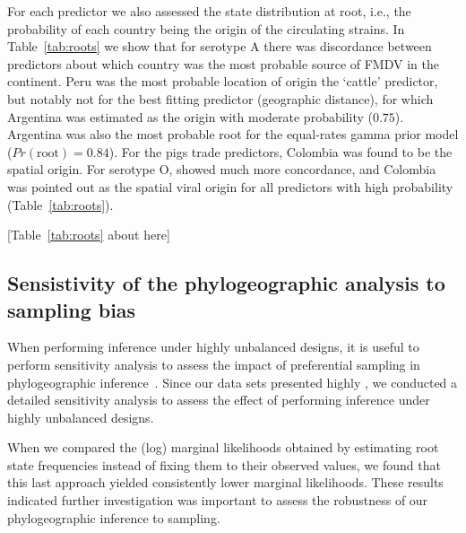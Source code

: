 \documentclass[10pt]{article}
\begin{document}
For each predictor we also assessed the state distribution at root, i.e., the probability of each country being the origin of the circulating strains.
In Table~\ref{tab:roots} we show that for serotype A there was discordance between predictors about which country was the most probable source of FMDV in the continent.
Peru was the most probable location of origin the `cattle' predictor, but notably not for the best fitting predictor (geographic distance), for which Argentina was estimated as the origin with moderate probability ($0.75$).
Argentina was also the most probable root for the equal-rates gamma prior model ($Pr(\text{root})=0.84$).
For the pigs trade predictors, Colombia was found to be the spatial origin.
For serotype O, showed much more concordance, and Colombia was pointed out as the spatial viral origin for all predictors with high probability (Table~\ref{tab:roots}).


\begin{center}
 [Table~\ref{tab:roots} about here]
\end{center}

\subsection*{Sensistivity of the phylogeographic analysis to sampling bias}

When performing inference under highly unbalanced designs, it is useful to perform sensitivity analysis to assess the impact of preferential sampling in phylogeographic inference~\cite{Faria2012,polar,fluPNAS}. 
Since our data sets presented highly , we conducted a detailed sensitivity analysis to assess the effect of performing inference under highly unbalanced designs.

When we compared the (log) marginal likelihoods obtained by estimating root state frequencies instead of fixing them to their observed values, we found that this last approach yielded consistently lower marginal likelihoods.
These results indicated further investigation was important to assess the robustness of our phylogeographic inference to sampling.
\end{document}
